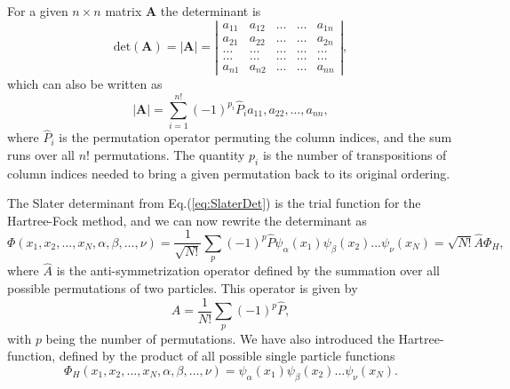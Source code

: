 \documentclass[../main.tex]{subfiles}
\begin{document}
For a given $n\times n$ matrix \textbf{A} the determinant is
\begin{equation}
    \textrm{det}(\mathbf{A}) = \left|\mathbf{A}\right| =
    \left| \begin{array}{ccccc} a_{11} & a_{12} & \dots & \dots & a_{1n}\\
                                a_{21} & a_{22} & \dots & \dots & a_{2n}\\
                                \dots & \dots & \dots & \dots & \dots\\
                                \dots & \dots & \dots & \dots & \dots\\
                                a_{n1} & a_{n2} & \dots & \dots & a_{nn}

             \end{array} \right|,
\end{equation}
which can also be written as
\begin{equation}
    \left|\mathbf{A}\right| = \sum_{i=1}^{n!}(-1)^{p_i} \hat{P}_i a_{11},a_{22},\dots,a_{nn},
\end{equation}
where $\hat{P}_i$ is the permutation operator permuting the column indices, and the sum runs over all $n!$ permutations. The quantity $p_i$ is the number of transpositions of column indices needed to bring a given permutation back to its original ordering.

The Slater determinant from Eq.(\ref{eq:SlaterDet}) is the trial function for the Hartree-Fock method, and we can now rewrite the determinant as
\begin{equation}
    \Phi(x_1,x_2,\dots,x_N,\alpha,\beta,\dots,\nu) = \frac{1}{\sqrt{N!}}\sum_p (-1)^p \hat{P} \psi_\alpha(x_1) \psi_\beta(x_2) \dots \psi_\nu(x_N) = \sqrt{N!} \hat{A} \Phi_H,
\end{equation}
where $\hat{A}$ is the anti-symmetrization operator defined by the summation over all possible permutations of two particles. This operator is given by
\begin{equation}
    \hat{A} = \frac{1}{N!} \sum_p (-1)^p \hat{P},
\end{equation}
with $p$ being the number of permutations. We have also introduced the Hartree-function, defined by the product of all possible single particle functions
\begin{equation}
    \Phi_H(x_1,x_2,\dots,x_N,\alpha,\beta,\dots,\nu) = \psi_\alpha(x_1) \psi_\beta(x_2) \dots \psi_\nu(x_N).
\end{equation}
\end{document}
